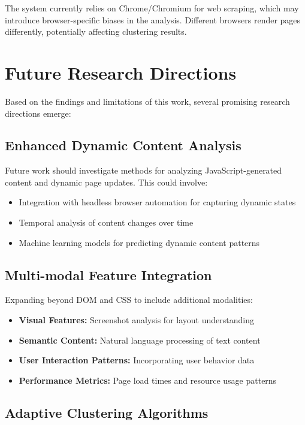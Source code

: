 The system currently relies on Chrome/Chromium for web scraping, which may introduce browser-specific biases in the analysis. Different browsers render pages differently, potentially affecting clustering results.

\section{Future Research Directions}
\label{sec:future_work}

Based on the findings and limitations of this work, several promising research directions emerge:

\subsection{Enhanced Dynamic Content Analysis}

Future work should investigate methods for analyzing JavaScript-generated content and dynamic page updates. This could involve:

\begin{itemize}
\item Integration with headless browser automation for capturing dynamic states
\item Temporal analysis of content changes over time
\item Machine learning models for predicting dynamic content patterns
\end{itemize}

\subsection{Multi-modal Feature Integration}

Expanding beyond DOM and CSS to include additional modalities:

\begin{itemize}
\item \textbf{Visual Features:} Screenshot analysis for layout understanding
\item \textbf{Semantic Content:} Natural language processing of text content
\item \textbf{User Interaction Patterns:} Incorporating user behavior data
\item \textbf{Performance Metrics:} Page load times and resource usage patterns
\end{itemize}

\subsection{Adaptive Clustering Algorithms}

